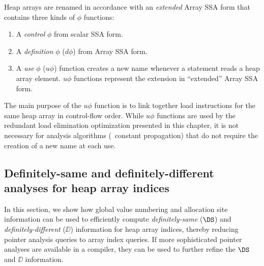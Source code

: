 
Heap arrays are renamed in accordance with 
an {\it extended}
Array SSA form that contains three kinds of $\phi$ functions:
\begin{enumerate}
\item 
A {\em control} $\phi$ from scalar SSA form.
\item
A {\em definition} $\phi$ ($d\phi$) from Array SSA form.
\item
A {\em use} $\phi$ ($u\phi$) function creates
a new name whenever a statement reads a heap array element.
$u\phi$ functions represent the extension
in ``extended'' Array SSA form.
\end{enumerate}
The main purpose of the $u\phi$ function is to link
together load instructions for the same heap array in control-flow order.   While $u\phi$ functions are used by the redundant load
elimination optimization presented in this chapter, it is not
necessary for analysis algorithms (\eg\ constant propagation) that do not require the creation of
a 
new name at each use.

\subsection{Definitely-same and definitely-different analyses for heap array indices}\label{svalnum}
In this section, we show how global value numbering and allocation
site information can be used to efficiently 
compute
{\it definitely-same} ($\DS$) and {\it definitely-different}
($\DD$) information for 
heap array indices, thereby 
reducing pointer analysis queries to array index queries.
If more sophisticated pointer analyses are available in a compiler,
they can be used to further refine the $\DS$ and $\DD$ information.

